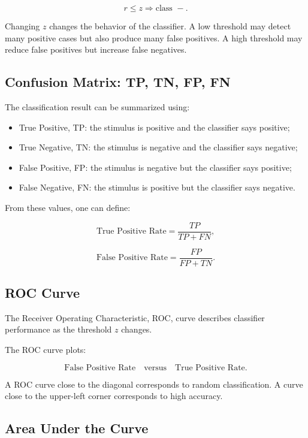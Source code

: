 \[
r \leq z \Rightarrow \text{class } -.
\]

Changing $z$ changes the behavior of the classifier. A low threshold may detect many positive cases but also produce many false positives. A high threshold may reduce false positives but increase false negatives.

\subsection{Confusion Matrix: TP, TN, FP, FN}

The classification result can be summarized using:

\begin{itemize}[noitemsep]
    \item True Positive, TP: the stimulus is positive and the classifier says positive;
    \item True Negative, TN: the stimulus is negative and the classifier says negative;
    \item False Positive, FP: the stimulus is negative but the classifier says positive;
    \item False Negative, FN: the stimulus is positive but the classifier says negative.
\end{itemize}

From these values, one can define:

\[
\text{True Positive Rate}
=
\frac{TP}{TP+FN},
\]

\[
\text{False Positive Rate}
=
\frac{FP}{FP+TN}.
\]

\subsection{ROC Curve}

The Receiver Operating Characteristic, ROC, curve describes classifier performance as the threshold $z$ changes.

The ROC curve plots:

\[
\text{False Positive Rate}
\quad \text{versus} \quad
\text{True Positive Rate}.
\]

A ROC curve close to the diagonal corresponds to random classification. A curve close to the upper-left corner corresponds to high accuracy.

\subsection{Area Under the Curve}

